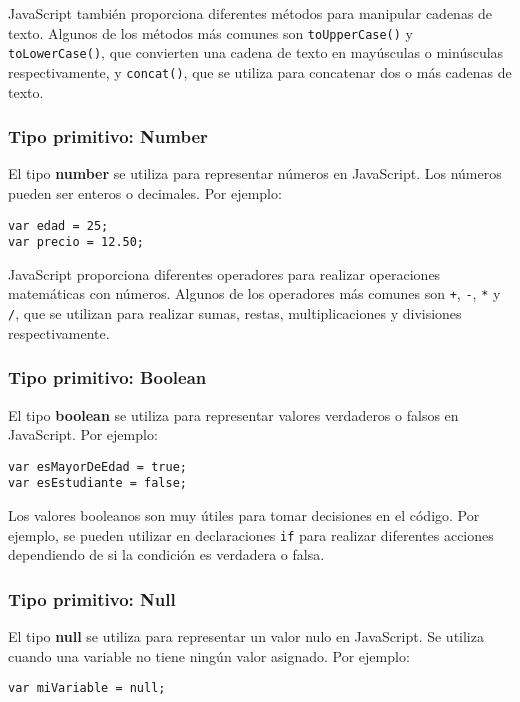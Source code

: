 \documentclass[executivepaper]{article}
\begin{document}
JavaScript también proporciona diferentes métodos para manipular cadenas de texto. Algunos de los métodos más comunes son \texttt{toUpperCase()} y \texttt{toLowerCase()}, que convierten una cadena de texto en mayúsculas o minúsculas respectivamente, y \texttt{concat()}, que se utiliza para concatenar dos o más cadenas de texto.

\subsubsection*{Tipo primitivo: Number}

El tipo \textbf{number} se utiliza para representar números en JavaScript. Los números pueden ser enteros o decimales. Por ejemplo:

\begin{lstlisting}
var edad = 25;
var precio = 12.50;
\end{lstlisting}

JavaScript proporciona diferentes operadores para realizar operaciones matemáticas con números. Algunos de los operadores más comunes son \texttt{+}, \texttt{-}, \texttt{*} y \texttt{/}, que se utilizan para realizar sumas, restas, multiplicaciones y divisiones respectivamente.

\subsubsection*{Tipo primitivo: Boolean}

El tipo \textbf{boolean} se utiliza para representar valores verdaderos o falsos en JavaScript. Por ejemplo:

\begin{lstlisting}
var esMayorDeEdad = true;
var esEstudiante = false;
\end{lstlisting}

Los valores booleanos son muy útiles para tomar decisiones en el código. Por ejemplo, se pueden utilizar en declaraciones \texttt{if} para realizar diferentes acciones dependiendo de si la condición es verdadera o falsa.

\subsubsection*{Tipo primitivo: Null}

El tipo \textbf{null} se utiliza para representar un valor nulo en JavaScript. Se utiliza cuando una variable no tiene ningún valor asignado. Por ejemplo:

\begin{lstlisting}
var miVariable = null;
\end{lstlisting}
\end{document}
